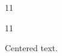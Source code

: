 \documentclass[paper=A4]{ropas-poster}
\begin{document}
\begin{postergrid}{1}{1}
\begin{posterblock}{1}{1}
\begin{center}Centered text.\end{center}
\end{posterblock}
\end{postergrid}
\end{document}
